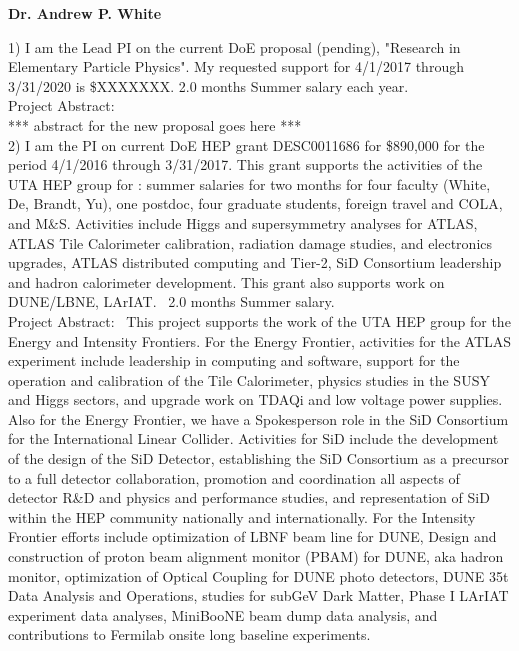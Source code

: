 \begin{center}
\textbf{Dr. Andrew P. White}
\end{center}

1) I am the Lead PI on the current DoE proposal (pending), "Research in Elementary
Particle Physics". My requested support for 4/1/2017 through 3/31/2020 is \$XXXXXXX.
2.0 months Summer salary each year.  \\

Project Abstract: \\
*** abstract for the new proposal goes here ***\\

2) I am the PI on current DoE HEP grant DESC0011686 for \$890,000 for the period 4/1/2016 through 3/31/2017.
This grant supports the activities of the UTA HEP group for : summer salaries for two months for four
faculty (White, De, Brandt, Yu), one postdoc, four graduate students, foreign travel and 
COLA, and M\&S. Activities include Higgs and supersymmetry analyses for ATLAS, ATLAS
Tile Calorimeter calibration, radiation damage studies, and electronics upgrades, 
ATLAS distributed computing and Tier-2, SiD Consortium leadership and hadron calorimeter
development. This grant also supports work on DUNE/LBNE, LArIAT. \
2.0 months Summer salary.\\

Project Abstract: \
This project supports the work of the UTA HEP group for the Energy and Intensity Frontiers.
For the Energy Frontier, activities for the ATLAS experiment include leadership in computing and software,
support for the operation and calibration of the Tile Calorimeter, physics studies in the SUSY and Higgs sectors,
and upgrade work on TDAQi and low voltage power supplies. Also for the Energy Frontier, we have a Spokesperson
role in the SiD Consortium for the International Linear Collider. Activities for SiD include 
the development of the design of the SiD Detector, establishing the SiD Consortium as a precursor to a full detector collaboration,
promotion and coordination all aspects of detector R\&D and physics and performance studies, and 
representation of SiD within the HEP community nationally and internationally.
For the Intensity Frontier efforts include optimization of LBNF beam line for DUNE,
Design and construction of proton beam alignment monitor (PBAM) for DUNE, aka hadron monitor,
optimization of Optical Coupling for DUNE photo detectors, DUNE 35t Data Analysis and Operations,
studies for subGeV Dark Matter, Phase I LArIAT experiment data analyses, MiniBooNE beam dump data analysis,
and contributions to Fermilab onsite long baseline experiments.
 \\




